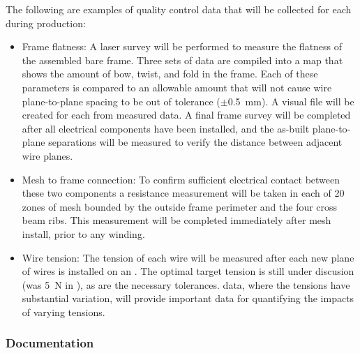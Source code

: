 The following are examples of quality control data that will be collected for each  during production:  

\begin{itemize}

\item Frame flatness: A laser survey will be performed to measure the flatness of the assembled bare frame. Three sets of data are compiled into a map that shows the amount of bow, twist, and fold in the frame. Each of these parameters is compared to an allowable amount that will not cause wire plane-to-plane spacing to be out of tolerance ($\pm$\SI{0.5}{mm}).  A visual file will be created for each  from measured data. A final frame survey will be completed after all electrical components have been installed, and the as-built plane-to-plane separations will be measured to verify the distance between adjacent wire planes.

\item Mesh to frame connection: To confirm sufficient electrical contact between these two components a resistance measurement will be taken in each of \num{20} zones of mesh bounded by the outside frame perimeter and the four cross beam ribs. This measurement will be completed immediately after mesh install, prior to any winding.

\item Wire tension: The tension of each wire will be measured after each new plane of wires is installed on an . The optimal target tension is still under discusion (was \SI{5}{N} in ), as are the necessary tolerances.   data, where the tensions have substantial variation, will provide important data for quantifying the impacts of varying tensions.  

\end{itemize}


\subsubsection{Documentation} 

